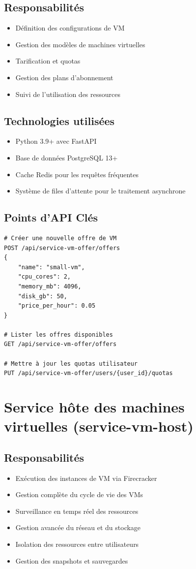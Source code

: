 \documentclass[12pt,a4paper]{report}
\begin{document}
\subsection{Responsabilités}
\begin{itemize}
    \item Définition des configurations de VM
    \item Gestion des modèles de machines virtuelles
    \item Tarification et quotas
    \item Gestion des plans d'abonnement
    \item Suivi de l'utilisation des ressources
\end{itemize}

\subsection{Technologies utilisées}
\begin{itemize}
    \item Python 3.9+ avec FastAPI
    \item Base de données PostgreSQL 13+
    \item Cache Redis pour les requêtes fréquentes
    \item Système de files d'attente pour le traitement asynchrone
\end{itemize}

\subsection{Points d'API Clés}
\begin{verbatim}
# Créer une nouvelle offre de VM
POST /api/service-vm-offer/offers
{
    "name": "small-vm",
    "cpu_cores": 2,
    "memory_mb": 4096,
    "disk_gb": 50,
    "price_per_hour": 0.05
}

# Lister les offres disponibles
GET /api/service-vm-offer/offers

# Mettre à jour les quotas utilisateur
PUT /api/service-vm-offer/users/{user_id}/quotas
\end{verbatim}

\section{Service hôte des machines virtuelles (service-vm-host)}
\subsection{Responsabilités}
\begin{itemize}
    \item Exécution des instances de VM via Firecracker
    \item Gestion complète du cycle de vie des VMs
    \item Surveillance en temps réel des ressources
    \item Gestion avancée du réseau et du stockage
    \item Isolation des ressources entre utilisateurs
    \item Gestion des snapshots et sauvegardes
\end{itemize}
\end{document}
